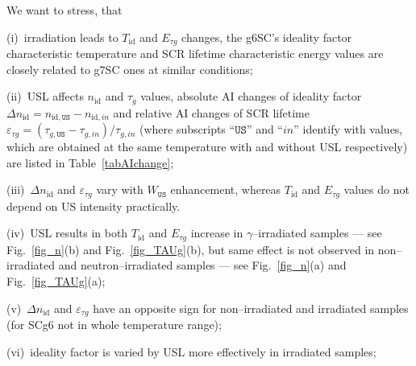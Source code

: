 \documentclass[aip,jap, amsmath,amssymb,reprint]{revtex4-1}
\begin{document}
We want to stress, that

\noindent
(i)~irradiation leads to $T_{\mathrm{id}}$ and $E_{\tau g}$ changes, the g6SC's ideality factor characteristic temperature and SCR lifetime characteristic energy values are closely related to g7SC ones at similar conditions;

\noindent
(ii)~USL affects $n_{\mathrm{id}}$ and $\tau_g$ values, absolute AI changes of ideality factor $\Delta n_{\mathrm{id}}=n_{\mathrm{id},\mathtt{US}}-n_{\mathrm{id},in}$ and
relative AI changes of SCR lifetime $\varepsilon_{\tau g}=(\tau_{g,\mathtt{US}}-\tau_{g,in})/\tau_{g,in}$
(where subscripts ``$\mathtt{US}$'' and ``$in$'' identify with values,
which are obtained at the same temperature with and without USL respectively)
are listed in Table~\ref{tabAIchange};

\noindent
(iii)~$\Delta n_{\mathrm{id}}$ and $\varepsilon_{\tau g}$ vary with $W_{\mathtt{US}}$ enhancement, whereas $T_{\mathrm{id}}$ and $E_{\tau g}$ values do not depend on US intensity practically.


\noindent
(iv)~USL results in both $T_{\mathrm{id}}$ and $E_{\tau g}$ increase in $\gamma$--irradiated samples --- see Fig.~\ref{fig_n}(b) and Fig.~\ref{fig_TAUg}(b), but same effect is not observed in non--irradiated and neutron--irradiated samples --- see Fig.~\ref{fig_n}(a) and Fig.~\ref{fig_TAUg}(a);

\noindent
(v)~$\Delta n_{\mathrm{id}}$ and $\varepsilon_{\tau g}$ have an opposite sign for non--irradiated and irradiated samples
(for SCg6 not in whole temperature range);

\noindent
(vi)~ideality factor is varied by USL more effectively in irradiated samples;


\end{document}
